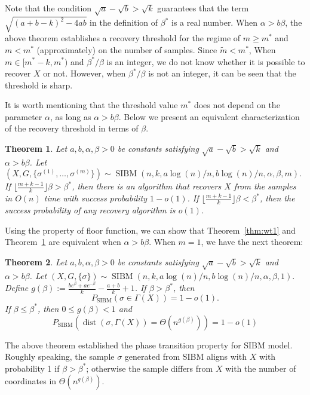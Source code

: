 \documentclass[conference]{IEEEtran}
\newtheorem{theorem}{Theorem}%
\DeclareMathOperator{\SIBM}{SIBM}
\DeclareMathOperator{\dist}{dist}
\begin{document}
Note that the condition $\sqrt{a}-\sqrt{b} > \sqrt{k}$ guarantees that the term $\sqrt{(a+b-k)^2-4ab}$ in the definition of $\beta^\ast$ is a real number.
When $\alpha > b \beta$,
the above theorem establishes a recovery threshold
for the regime of $m \geq m^\ast$ and $m < m^\ast$ (approximately) on the number of samples. Since $\tilde{m} < m^*$,
When $m \in [m^* - k, m^\ast)$ and $\beta^\ast/\beta$ is an integer, we do not know whether it is possible to recover $X$ or not.
However, when $\beta^\ast/\beta$ is not an integer, it can be seen that the threshold is sharp.

It is worth mentioning that the threshold value $m^\ast$ does not depend on the parameter $\alpha$, as long as $\alpha>b\beta$.
Below we present an equivalent characterization of the recovery threshold in terms of $\beta$.
\begin{theorem} \label{thm:wt2}
	Let $a,b,\alpha,\beta> 0$ be constants satisfying $\sqrt{a}-\sqrt{b} > \sqrt{k}$ and $\alpha>b\beta$. 
	Let 
	$
	(X,G,\{\sigma^{(1)},\dots,\sigma^{(m)}\}) \sim \SIBM(n, k, a\log(n)/n, b\log(n)/n,\alpha,\beta,m).
	$
	If $\lfloor \frac{m+k-1}{k} \rfloor \beta>\beta^\ast$,
	then there is an algorithm that recovers $X$ from the samples in $O(n)$ time with success probability $1-o(1)$.
	If $\lfloor \frac{m+k-1}{k} \rfloor \beta <\beta^\ast$, then the success probability of any recovery algorithm is $o(1)$. 
\end{theorem}
Using the property of floor function, we can show that Theorem~\ref{thm:wt1} and Theorem~\ref{thm:wt2} are equivalent when $\alpha > b \beta$.
When $m=1$, we have the next theorem:

\begin{theorem}  \label{thm:wt3}
Let $a,b,\alpha,\beta> 0$ be constants satisfying $\sqrt{a}-\sqrt{b} > \sqrt{k}$ and $\alpha>b\beta$.
Let 
$
(X,G,\{\sigma\}) \sim \SIBM(n,k, a\log(n)/n, b\log(n)/n,\alpha,\beta,1).
$
Define $g(\beta)  := \frac{b e^{\beta}+a e^{-\beta}}{k}-\frac{a+b}{k}+1$.
If $\beta>\beta^\ast$, then
$$
P_{\SIBM}(\sigma \in \Gamma(X)) = 1-o(1).
$$
If $\beta\le \beta^\ast$, then $0\leq g(\beta) < 1$ and
$$
P_{\SIBM}(\dist(\sigma, \Gamma(X))= \Theta(n^{g(\beta)})) = 1-o(1)
$$
\end{theorem}

The above theorem established the phase transition property for SIBM model.
Roughly speaking, the sample $\sigma$ generated from SIBM aligns with $X$ with probability 1 if $\beta > \beta^*$;
otherwise the sample differs from $X$ with the number of coordinates in $\Theta(n^{g(\beta)})$.
\end{document}
